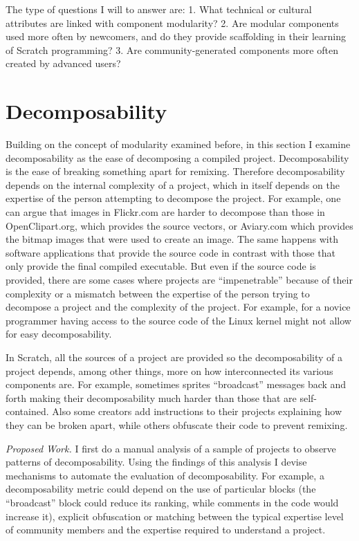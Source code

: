 The type of questions I will to answer are:
1. What technical or cultural attributes are linked with component modularity? 
2. Are modular components used more often by newcomers, and do they provide scaffolding in their learning of Scratch programming?
3. Are community-generated components more often created by advanced users?

\section{Decomposability}
Building on the concept of modularity examined before, in this section I examine decomposability as the ease of decomposing a compiled project.
Decomposability is the ease of breaking something apart for remixing.
Therefore decomposability depends on the internal complexity of a project, which in itself depends on the expertise of the person attempting to decompose the project.
For example, one can argue that images in Flickr.com are harder to decompose than those in OpenClipart.org, which provides the source vectors, or Aviary.com which provides the bitmap images that were used to create an image.
The same happens with software applications that provide the source code in contrast with those that only provide the final compiled executable.
But even if the source code is provided, there are some cases where projects are ``impenetrable'' because of their complexity or a mismatch between the expertise of the person trying to decompose a project and the complexity of the project. 
For example, for a novice programmer having access to the source code of the Linux kernel might not allow for easy decomposability.

In Scratch, all the sources of a project are provided so the decomposability of a project depends, among other things, more on how interconnected its various components are. 
For example, sometimes sprites ``broadcast'' messages back and forth making their decomposability much harder than those that are self-contained.
Also some creators add instructions to their projects explaining how they can be broken apart, while others obfuscate their code to prevent remixing.

\emph{Proposed Work.}
I first do a manual analysis of a sample of projects to observe patterns of decomposability. 
Using the findings of this analysis I devise mechanisms to automate the evaluation of decomposability. 
For example, a decomposability metric could depend on the use of particular blocks (the ``broadcast'' block could reduce its ranking, while comments in the code would increase it), explicit obfuscation or matching between the typical expertise level of community members and the expertise required to understand a project.

